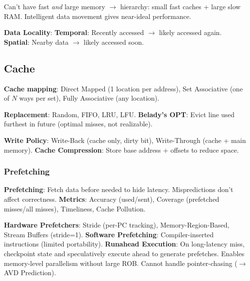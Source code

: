 \begin{remark}
	Can't have fast \textit{and} large memory $\to$ hierarchy: small fast caches + large slow RAM. Intelligent data movement gives near-ideal performance.
\end{remark}

\begin{definition}
	\textbf{Data Locality}:
	\textbf{Temporal}: Recently accessed $\to$ likely accessed again.
	\textbf{Spatial}: Nearby data $\to$ likely accessed soon.
\end{definition}

\subsection{Cache}

\begin{definition}
	\textbf{Cache mapping}: Direct Mapped (1 location per address), Set Associative (one of $N$ ways per set), Fully Associative (any location).
\end{definition}

\begin{definition}
	\textbf{Replacement}: Random, FIFO, LRU, LFU.
	\textbf{Belady's OPT}: Evict line used furthest in future (optimal misses, not realizable).
\end{definition}

\begin{definition}
	\textbf{Write Policy}: Write-Back (cache only, dirty bit), Write-Through (cache + main memory).
	\textbf{Cache Compression}: Store base address + offsets to reduce space.
\end{definition}

\subsubsection{Prefetching}

\begin{definition}
	\textbf{Prefetching}: Fetch data before needed to hide latency. Mispredictions don't affect correctness.
	\textbf{Metrics}: Accuracy (used/sent), Coverage (prefetched misses/all misses), Timeliness, Cache Pollution.
\end{definition}

\begin{definition}
	\textbf{Hardware Prefetchers}: Stride (per-PC tracking), Memory-Region-Based, Stream Buffers (stride=1).
	\textbf{Software Prefetching}: Compiler-inserted instructions (limited portability).
	\textbf{Runahead Execution}: On long-latency miss, checkpoint state and speculatively execute ahead to generate prefetches. Enables memory-level parallelism without large ROB. Cannot handle pointer-chasing ($\to$ AVD Prediction).
\end{definition}

